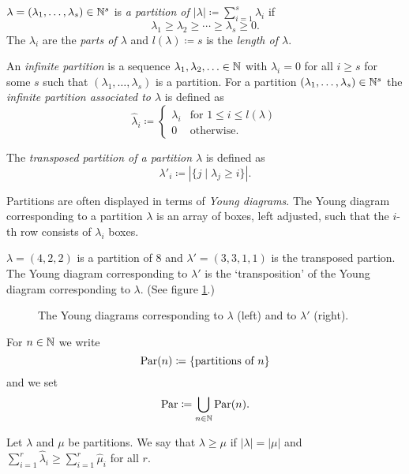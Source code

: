\begin{defi}
 $\lambda = (\lambda_1, \dotsc, \lambda_s) \in \mathbb{N}^s$ is \emph{a partition of $|\lambda| \coloneqq \sum_{i=1}^s \lambda_i$} if
 \[
  \lambda_1 \geq \lambda_2 \geq \dotsb \geq \lambda_s \geq 0.
 \]
 The $\lambda_i$ are the \emph{parts of $\lambda$} and $l(\lambda) \coloneqq s$ is the \emph{length of $\lambda$}.
 
 An \emph{infinite partition} is a sequence $\lambda_1, \lambda_2, \dotsc \in \mathbb{N}$ with $\lambda_i = 0$ for all $i \geq s$ for some $s$ such that $(\lambda_1, \dotsc, \lambda_s)$ is a partition. For a partition $(\lambda_1, \dotsc, \lambda_s) \in \mathbb{N}^s$ the \emph{infinite partition associated to $\lambda$} is defined as
 \[
  \hat{\lambda}_i \coloneqq
  \begin{cases}
   \lambda_i & \text{for } 1 \leq i \leq l(\lambda) \\
           0 & \text{otherwise}.
  \end{cases}
 \]
 
 The \emph{transposed partition of a partition $\lambda$} is defined as
 \[
  \lambda'_i \coloneqq |\{j \mid \lambda_j \geq i\}|.
 \]
\end{defi}

Partitions are often displayed in terms of \emph{Young diagrams}. The Young diagram corresponding to a partition $\lambda$ is an array of boxes, left adjusted, such that the $i$-th row consists of $\lambda_i$ boxes.


\begin{expl}
 $\lambda = (4,2,2)$ is a partition of $8$ and $\lambda' = (3,3,1,1)$ is the transposed partion. The Young diagram corresponding to $\lambda'$ is the `transposition' of the Young diagram corresponding to $\lambda$. (See figure \ref{fig: Young diagram example}.)
 \begin{figure}
  \centering
  \qquad
  \caption{The Young diagrams corresponding to $\lambda$ (left) and to $\lambda'$ (right).}
  \label{fig: Young diagram example}
 \end{figure}
\end{expl}


\begin{defi}
 For $n \in \mathbb{N}$ we write
 \[
  \operatorname{Par}(n) \coloneqq \{\text{partitions of $n$}\}
 \]
 and we set
 \[
  \operatorname{Par} \coloneqq \bigcup_{n \in \mathbb{N}} \operatorname{Par}(n).
 \]
\end{defi}
 

\begin{defi}
 Let $\lambda$ and $\mu$ be partitions. We say that $\lambda \geq \mu$ if $|\lambda| = |\mu|$ and $\sum_{i=1}^r \hat{\lambda}_i \geq \sum_{i=1}^r \hat{\mu}_i$ for all $r$.
\end{defi}


